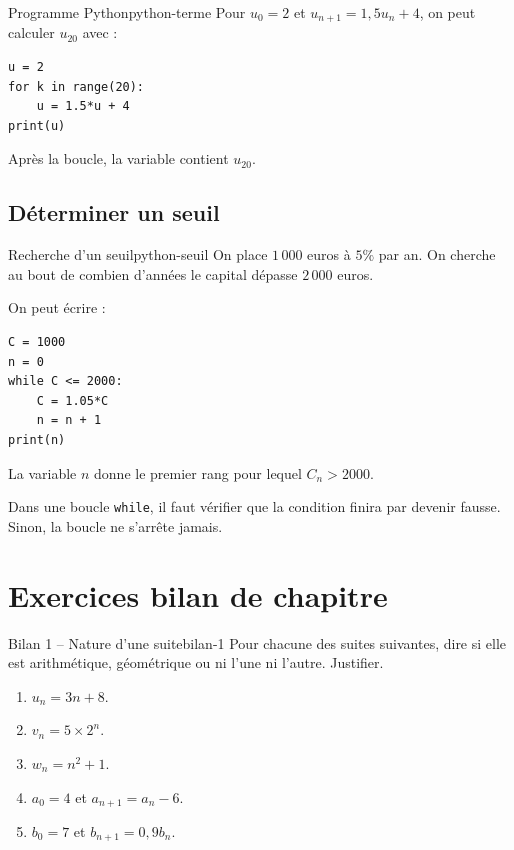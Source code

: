 \documentclass[11pt,a4paper]{article}
\begin{document}
\begin{examplebox}{Programme Python}{python-terme}
Pour $u_0=2$ et $u_{n+1}=1{,}5u_n+4$, on peut calculer $u_{20}$ avec :
\begin{verbatim}
u = 2
for k in range(20):
    u = 1.5*u + 4
print(u)
\end{verbatim}
Après la boucle, la variable contient $u_{20}$.
\end{examplebox}

\subsection{Déterminer un seuil}

\begin{examplebox}{Recherche d'un seuil}{python-seuil}
On place $1\,000$ euros à $5\%$ par an. On cherche au bout de combien d'années le capital dépasse $2\,000$ euros.

On peut écrire :
\begin{verbatim}
C = 1000
n = 0
while C <= 2000:
    C = 1.05*C
    n = n + 1
print(n)
\end{verbatim}
La variable $n$ donne le premier rang pour lequel $C_n>2000$.
\end{examplebox}

\begin{warningbox}
Dans une boucle \texttt{while}, il faut vérifier que la condition finira par devenir fausse. Sinon, la boucle ne s'arrête jamais.
\end{warningbox}

\section{Exercices bilan de chapitre}

\begin{exercisebox}{Bilan 1 -- Nature d'une suite}{bilan-1}
Pour chacune des suites suivantes, dire si elle est arithmétique, géométrique ou ni l'une ni l'autre. Justifier.
\begin{enumerate}
  \item $u_n=3n+8$.
  \item $v_n=5\times2^n$.
  \item $w_n=n^2+1$.
  \item $a_0=4$ et $a_{n+1}=a_n-6$.
  \item $b_0=7$ et $b_{n+1}=0{,}9b_n$.
\end{enumerate}
\end{exercisebox}
\end{document}
